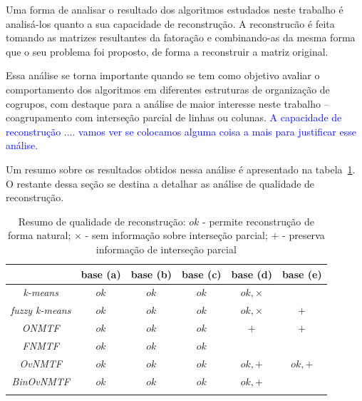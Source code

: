 \documentclass[
    12pt,                %
    oneside,            %
    a4paper,            %
    english,            %
    brazil                %
    ]{abntex2ppgsi}
\begin{document}
Uma forma de analisar o resultado dos algoritmos estudados neste trabalho é analisá-los quanto a sua capacidade de reconstrução.
A reconstrucão é feita tomando as matrizes resultantes da fatoração e combinando-as da mesma forma que o seu problema foi proposto, de forma a reconstruir a matriz original.

Essa análise se torna importante quando se tem como objetivo avaliar o comportamento dos algoritmos em diferentes estruturas de organização de cogrupos, com destaque para a análise de maior interesse neste trabalho -- coagrupamento com interseção parcial de linhas ou colunas.
\textcolor{blue}{A capacidade de reconstrução .... vamos ver se colocamos alguma coisa a mais para justificar esse análise.}

Um resumo sobre os resultados obtidos nessa análise é apresentado na tabela~\ref{tab:resumoREC}.
O restante dessa seção se destina a detalhar as análise de qualidade de reconstrução.

\begin{table}[htpb]
\centering
    \caption{Resumo de qualidade de reconstrução: $ok$ - permite reconstrução de forma natural; $\times$ - sem informação sobre interseção parcial; $+$ - preserva informação de interseção parcial}
        \begin{tabular}{cccccc}
            \hline
            & \textbf{base (a)} & \textbf{base (b)} & \textbf{base (c)} & \textbf{base (d)}& \textbf{base (e)} \\
            \hline
            \textit{k-means}       & $ok$ & $ok$ & $ok$ & $ok, \times$ &     \\
            \textit{fuzzy k-means} & $ok$ & $ok$ & $ok$ & $ok, \times$ & $+$ \\
            \textit{ONMTF}         & $ok$ & $ok$ & $ok$ & $+$          & $+$ \\
            \textit{FNMTF}         & $ok$ & $ok$ & $ok$ &              &     \\
            \textit{OvNMTF}        & $ok$ & $ok$ & $ok$ & $ok, +$      & $ok, +$ \\
            \textit{BinOvNMTF}     & $ok$ & $ok$ & $ok$ & $ok, +       $ &   \\
            \hline
             & & & & &  \\
        \end{tabular}
    \label{tab:resumoREC}
\end{table}
\end{document}

